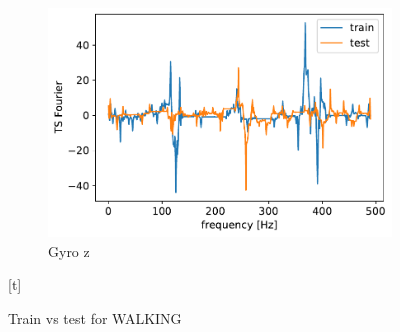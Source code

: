 \documentclass[10pt, a4paper, twocolumn]{article}
\begin{document}
\begin{figure}
\begin{subfigure}[t]{0.15\textwidth}
    \includegraphics[width=\linewidth]{gyro_z_WALKING.pdf}
    \caption{Gyro z  }
    \end{subfigure}
    
[t]    \caption{Train vs test for WALKING}\label{walcomp}
    
\end{figure}
  
\end{document}
